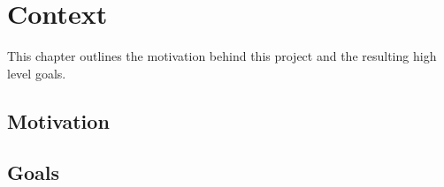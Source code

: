 \chapter{Context}
\label{chapter:context}
  This chapter outlines the motivation behind this project and the resulting high level goals.

  \section{Motivation}
  \section{Goals}
